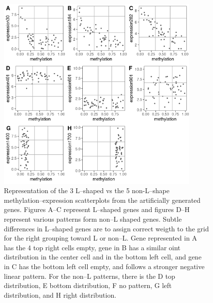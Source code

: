\documentclass[10pt,letterpaper]{article}
\begin{document}
\begin{figure}
\hypertarget{id}{%
\centering
\includegraphics[width=0.9\textwidth,height=0.5\textheight]{figures/Figure3.png}
\caption{Representation of the 3 L--shaped vs the 5 non-L--shape
methylation--expression scatterplots from the artificially generated
genes. Figures A--C represent L--shaped genes and figures D--H represent
various patterns form non--L shaped genes. Subtle differences in
L--shaped genes are to assign correct weigth to the grid for the right
grouping toward L or non--L. Gene represented in A has the 4 top right
cells empty, gene in B has a similar oint distribution in the center
cell and in the bottom left cell, and gene in C has the bottom left cell
empty, and follows a stronger negative linear pattern. For the non--L
patterns, there is the D top distribution, E bottom distribution, F no
pattern, G left distribution, and H right distribution.}\label{id}
}
\end{figure}
\end{document}
